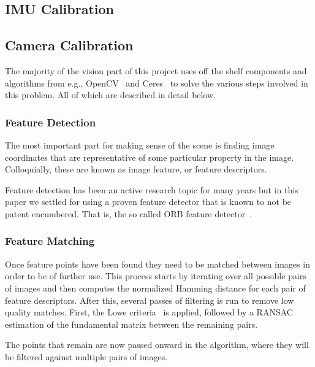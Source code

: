 \documentclass[preprint,acmtog]{acmart}
\begin{document}
\subsection{IMU Calibration}

\subsection{Camera Calibration}

The majority of the vision part of this project uses off the shelf components
and algorithms from e.g., OpenCV~\cite{opencv_library} and
Ceres~\cite{ceres-solver} to solve the various steps involved in this
problem. All of which are described in detail below.

\subsubsection{Feature Detection}

The most important part for making sense of the scene is finding image
coordinates that are representative of some particular property in the
image. Colloquially, these are known as image feature, or feature descriptors.

Feature detection has been an active research topic for many years but in this
paper we settled for using a proven feature detector that is known to not be
patent encumbered. That is, the so called ORB feature detector~\cite{orb2011}.


\subsubsection{Feature Matching}

Once feature points have been found they need to be matched between images in
order to be of further use. This process starts by iterating over all possible
pairs of images and then computes the normalized Hamming distance for each pair
of feature descriptors. After this, several passes of filtering is run to remove
low quality matches. First, the Lowe criteria~\cite{sift2004} is applied,
followed by a RANSAC~\cite{ransac} estimation of the fundamental matrix between
the remaining pairs.



The points that remain are now passed onward in the algorithm, where they will
be filtered against multiple pairs of images.
\end{document}

